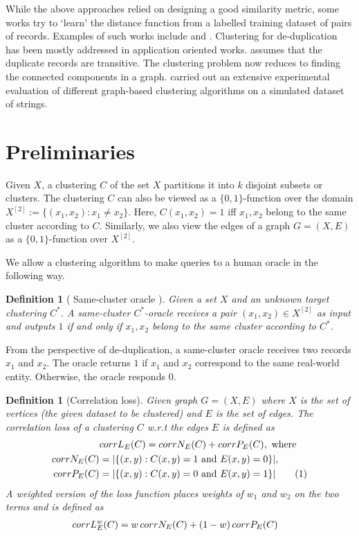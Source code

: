 \documentclass[12pt]{article}
\newtheorem{definition}[theorem]{Definition}
\newcommand\numberthis{\addtocounter{equation}{1}\tag{\theequation}}
\begin{document}
While the above approaches relied on designing a good similarity metric, some works try to `learn' the distance function from a labelled training dataset of pairs of records. Examples of such works include \cite{cochinwala2001efficient} and \cite{bilenko2003adaptive}. Clustering for de-duplication has been mostly addressed in application oriented works. \cite{hernandez1995merge} assumes that the duplicate records are transitive. The clustering problem now reduces to finding the connected components in a graph. \cite{hassanzadeh2009framework} carried out an extensive experimental evaluation of different graph-based clustering algorithms on a simulated dataset of strings.

\section{Preliminaries}
\label{section:problemFormulation}
Given $X$, a clustering $C$ of the set $X$ partitions it into $k$ disjoint subsets or clusters. The clustering $C$ can also be viewed as a $\{0, 1\}$-function over the domain $X^{[2]} := \{(x_1, x_2) : x_1 \neq x_2\}$. Here, $C(x_1, x_2) = 1$ iff $x_1, x_2$ belong to the same cluster according to $C$. Similarly, we also view the edges of a graph $G = (X, E)$ as a $\{0, 1\}$-function over $X^{[2]}$.

We allow a clustering algorithm to make queries to a human oracle in the following way. 
\begin{definition}[ Same-cluster oracle \cite{ashtiani2016clustering}]
Given a set $X$ and an unknown target clustering $C^*$. A same-cluster $C^*$-oracle receives a pair $(x_1, x_2) \in X^{[2]}$ as input and outputs $1$ if and only if $x_1, x_2$ belong to the same cluster according to $C^*$. 
\end{definition}
From the perspective of de-duplication, a same-cluster oracle receives two records $x_1$ and $x_2$. The oracle returns $1$ if $x_1$ and $x_2$ correspond to the same real-world entity. Otherwise, the oracle responds $0$.

\begin{definition}[Correlation loss\cite{bansal2004correlation}]
\label{defn:correlationLoss}
Given graph $G = (X, E)$ where $X$ is the set of vertices (the given dataset to be clustered) and $E$ is the set of edges. The correlation loss of a clustering $C$ w.r.t the edges $E$ is defined as \begin{align*}
  &corrL_{E}(C) = corrN_{E}(C) + corrP_{E}(C), \text{ where}\\
  corrN_{E}(C) &= |\{(x, y): C(x, y) = 1 \text{ and } E(x, y) = 0\}|,\\ 
  corrP_{E}(C) &= |\{(x, y): C(x, y) = 0 \text{ and } E(x, y) = 1\}| \numberthis\label{eqn:correlationLoss}
\end{align*}
A weighted version of the loss function places weights of $w_1$ and $w_2$ on the two terms and is defined as 
\begin{align}
  &corrL_{E}^{w}(C) = w \thinspace corrN_{E}(C) + (1-w) \thinspace corrP_{E}(C)\label{eqn:weightedCorrelationLoss}
\end{align}
\end{definition}
\end{document}
